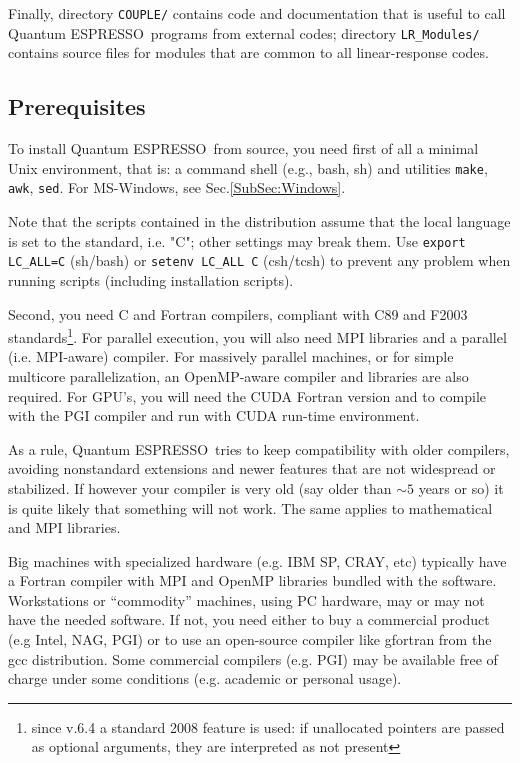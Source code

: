 \documentclass[12pt,a4paper]{article}
\def\qe{{\sc Quantum ESPRESSO}}
\def\make{\texttt{make}}
\begin{document}
Finally, directory \texttt{COUPLE/} contains code and documentation
that is useful to call \qe\ programs from external codes; directory
\texttt{LR\_Modules/} contains source files for modules that are common
to all linear-response codes.
\subsection{Prerequisites}
\label{Sec:Installation}

To install \qe\ from source, you need first of all a minimal Unix
environment, that is: a command shell (e.g., bash, sh) and utilities \make,
\texttt{awk}, \texttt{sed}. For MS-Windows, see Sec.\ref{SubSec:Windows}.

Note that the scripts contained
in the distribution assume that the local  language is set to the
standard, i.e. "C"; other settings
may break them. Use \texttt{export LC\_ALL=C} (sh/bash) or
\texttt{setenv LC\_ALL C} (csh/tcsh) to prevent any problem
when running scripts (including installation scripts).

Second, you need C and Fortran compilers, compliant with C89 and
F2003 standards\footnote{since v.6.4 a standard 2008 feature is
used: if unallocated pointers are passed as optional arguments,
they are interpreted as not present}. For parallel
execution, you will also need MPI libraries and a parallel
(i.e. MPI-aware) compiler. For massively parallel machines, or
for simple multicore parallelization, an OpenMP-aware compiler
and libraries are also required. For GPU's, you will need the
CUDA Fortran version and to compile with the PGI compiler and
run with CUDA run-time environment.

As a rule, \qe\ tries to keep compatibility with older compilers,
avoiding nonstandard extensions and newer features that
are not widespread or stabilized. If however your compiler is very
old (say older than $\sim 5$ years or so) it is quite likely that 
something will not work. The same applies to mathematical 
and MPI libraries.

Big machines with
specialized hardware (e.g. IBM SP, CRAY, etc) typically have a
Fortran compiler with MPI and OpenMP libraries bundled with
the software. Workstations or ``commodity'' machines, using PC
hardware, may or may not have the needed software. If not, you need
either to buy a commercial product (e.g Intel, NAG, PGI) or to
use an open-source compiler like gfortran from the gcc distribution.
Some commercial compilers (e.g. PGI) may be available free of charge 
under some conditions (e.g. academic or personal usage).
\end{document}
